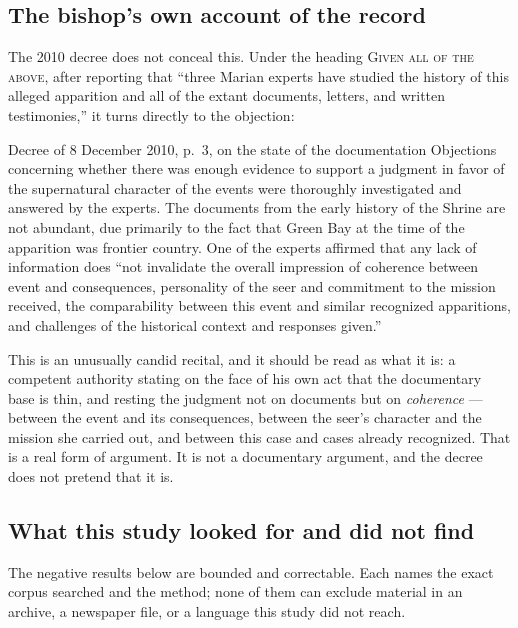 \subsection{The bishop's own account of the record}

The 2010 decree does not conceal this. Under the heading \textsc{Given
all of the above}, after reporting that ``three Marian experts have
studied the history of this alleged apparition and all of the extant
documents, letters, and written testimonies,'' it turns directly to the
objection:

\begin{witnesstext}{Decree of 8 December 2010, p.~3, on the state of
the documentation}
Objections concerning whether there was enough evidence to support a
judgment in favor of the supernatural character of the events were
thoroughly investigated and answered by the experts. The documents from
the early history of the Shrine are not abundant, due primarily to the
fact that Green Bay at the time of the apparition was frontier country.
One of the experts affirmed that any lack of information does ``not
invalidate the overall impression of coherence between event and
consequences, personality of the seer and commitment to the mission
received, the comparability between this event and similar recognized
apparitions, and challenges of the historical context and responses
given.''
\end{witnesstext}

This is an unusually candid recital, and it should be read as what it
is: a competent authority stating on the face of his own act that the
documentary base is thin, and resting the judgment not on documents but
on \emph{coherence} --- between the event and its consequences, between
the seer's character and the mission she carried out, and between this
case and cases already recognized. That is a real form of argument. It
is not a documentary argument, and the decree does not pretend that it
is.

\subsection{What this study looked for and did not find}

The negative results below are bounded and correctable. Each names the
exact corpus searched and the method; none of them can exclude material
in an archive, a newspaper file, or a language this study did not
reach.

